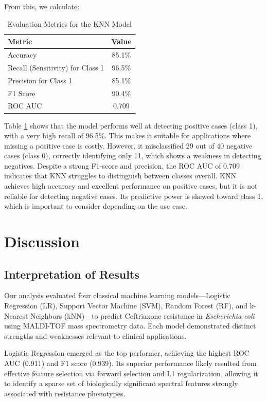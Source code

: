 \documentclass{article}
\begin{document}
From this, we calculate:

\begin{table}[h!]
\centering
\caption{Evaluation Metrics for the KNN Model}
\label{tab:evaluation_metrics_class1}
\begin{tabular}{|l|c|}
\hline
\textbf{Metric} & \textbf{Value} \\
\hline
Accuracy  & 85.1\% \\
Recall (Sensitivity) for Class 1 & 96.5\% \\
Precision for Class 1 & 85.1\% \\
F1 Score  & 90.4\% \\
ROC AUC   & 0.709 \\
\hline
\end{tabular}
\end{table}

Table \ref{tab:evaluation_metrics_class1} shows that the model performs well at detecting positive cases (class 1), with a very high recall of 96.5\%. This makes it suitable for applications where missing a positive case is costly.
However, it misclassified 29 out of 40 negative cases (class 0), correctly identifying only 11, which shows a weakness in detecting negatives.
Despite a strong F1-score and precision, the ROC AUC of 0.709 indicates that KNN struggles to distinguish between classes overall.
KNN achieves high accuracy and excellent performance on positive cases, but it is not reliable for detecting negative cases. Its predictive power is skewed toward class 1, which is important to consider depending on the use case. \citep{ibm-knn}


\section{Discussion}

\subsection{Interpretation of Results}

Our analysis evaluated four classical machine learning models—Logistic Regression (LR), Support Vector Machine (SVM), Random Forest (RF), and k-Nearest Neighbors (kNN)—to predict Ceftriaxone resistance in \textit{Escherichia coli} using MALDI-TOF mass spectrometry data. Each model demonstrated distinct strengths and weaknesses relevant to clinical applications.

Logistic Regression emerged as the top performer, achieving the highest ROC AUC (0.911) and F1 score (0.939). Its superior performance likely resulted from effective feature selection via forward selection and L1 regularization, allowing it to identify a sparse set of biologically significant spectral features strongly associated with resistance phenotypes.
\end{document}
